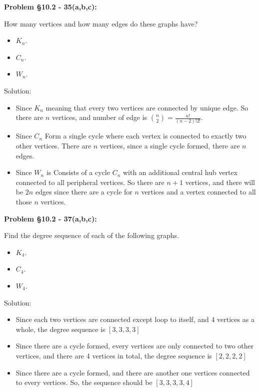 \documentclass{article}
\newenvironment{problem}[1]
{\begin{mdframed}[default]
\textbf{Problem #1:}
}
{\end{mdframed}
}
\begin{document}
\begin{problem}{\S 10.2 - 35(a,b,c)}
How many vertices and how many edges do these graphs have?
\begin{itemize}
\item[(a)] $K_n$.
\item[(b)] $C_n$.
\item[(c)] $W_n$.
\end{itemize}

Solution:

\begin{itemize}
    \item[(a)] Since $K_n$ meaning that every two vertices are connected by unique edge. So there are $n$ vertices, and number of edge is ${n \choose 2}=\frac{n!}{(n-2)!2!}$.
    \item[(b)] Since $C_n$ Form a single cycle where each vertex is connected to exactly two other vertices. There are $n$ vertices, since a single cycle formed, there are $n$ edges.
    \item[(c)] Since $W_n$ is Consists of a cycle $C_{n}$ with an additional central hub vertex connected to all peripheral vertices. So there are $n+1$ vertices, and there will be $2n$ edges since there are a cycle for $n$ vertices and a vertex connected to all those $n$ vertices.
\end{itemize}
\end{problem}
\begin{problem}{\S 10.2 - 37(a,b,c)}
Find the degree sequence of each of the following graphs.
\begin{itemize}
\item[(a)] $K_4$.
\item[(b)] $C_4$.
\item[(c)] $W_4$.
\end{itemize}
Solution:

\begin{itemize}
    \item[(a)] Since each two vertices are connected except loop to itself, and 4 vertices as a whole, the degree sequence is $[3,3,3,3]$
    \item[(b)] Since there are a cycle formed, every vertices are only connected to two other vertices, and there are 4 vertices in total, the degree sequence is $[2,2,2,2]$
    \item[(c)] Since there are a cycle formed, and there are another one vertices connected to every vertices. So, the sequence should be $[3,3,3,3,4]$
\end{itemize}
\end{problem}
\end{document}
